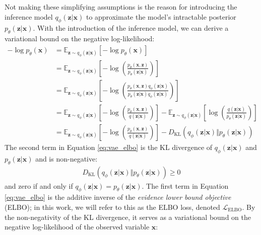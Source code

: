 \documentclass[ oneside,%
                    author={George Herbert},
                    degree={MSci},
                     title={Diffusion Models for Time-Evolving Precipitation Fields},
                  subtitle={}]{dissertation}
\begin{document}
Not making these simplifying assumptions is the reason for introducing the inference model $q_\phi(\mathbf{z}|\mathbf{x})$ to approximate the model's intractable posterior $p_\theta(\mathbf{z}|\mathbf{x})$. With the introduction of the inference model, we can derive a variational bound on the negative log-likelihood:
\begin{align}
      -\log p_\theta(\mathbf{x})&=\mathbb{E}_{\mathbf{z}\sim q_\phi(\mathbf{z}|\mathbf{x})}\left[-\log p_\theta(\mathbf{x})\right]\\
      &=\mathbb{E}_{\mathbf{z}\sim q_\phi(\mathbf{z}|\mathbf{x})}\left[-\log\left(\frac{p_\theta(\mathbf{x},\mathbf{z})}{p_\theta(\mathbf{z}|\mathbf{x})}\right)\right]\\
      &=\mathbb{E}_{\mathbf{z}\sim q_\phi(\mathbf{z}|\mathbf{x})}\left[-\log\left(\frac{p_\theta(\mathbf{x},\mathbf{z})q_\phi(\mathbf{z}|\mathbf{x})}{p_\theta(\mathbf{z}|\mathbf{x})q_\phi(\mathbf{z}|\mathbf{x})}\right)\right]\\
      &=\mathbb{E}_{\mathbf{z}\sim q_\phi(\mathbf{z}|\mathbf{x})}\left[-\log\left(\frac{p_\theta(\mathbf{x},\mathbf{z})}{q(\mathbf{z}|\mathbf{x})}\right)\right]-\mathbb{E}_{\mathbf{z}\sim q_\phi(\mathbf{z}|\mathbf{x})}\left[\log\left(\frac{q(\mathbf{z}|\mathbf{x})}{p_\theta(\mathbf{z}|\mathbf{x})}\right)\right]\\
      &=\mathbb{E}_{\mathbf{z}\sim q_\phi(\mathbf{z}|\mathbf{x})}\left[-\log\left(\frac{p_\theta(\mathbf{x},\mathbf{z})}{q(\mathbf{z}|\mathbf{x})}\right)\right]-D_{\mathrm{KL}}(q_\phi(\mathbf{z}|\mathbf{x})\Vert p_\theta(\mathbf{z}|\mathbf{x}))
      \label{eq:vae_elbo}
\end{align}
The second term in Equation \ref{eq:vae_elbo} is the KL divergence of $q_\phi(\mathbf{z}|\mathbf{x})$ and $p_\theta(\mathbf{z}|\mathbf{x})$ and is non-negative:
\begin{align}
      D_{\mathrm{KL}}(q_\phi(\mathbf{z}|\mathbf{x})\Vert p_\theta(\mathbf{z}|\mathbf{x}))\ge 0
\end{align}
and zero if and only if $q_\phi(\mathbf{z}|\mathbf{x})=p_\theta(\mathbf{z}|\mathbf{x})$. The first term in Equation \ref{eq:vae_elbo} is the additive inverse of the \textit{evidence lower bound objective} (ELBO); in this work, we will refer to this as the ELBO loss, denoted $\mathcal{L}_{\mathrm{ELBO}}$. By the non-negativity of the KL divergence, it serves as a variational bound on the negative log-likelihood of the observed variable $\mathbf{x}$:
\end{document}

